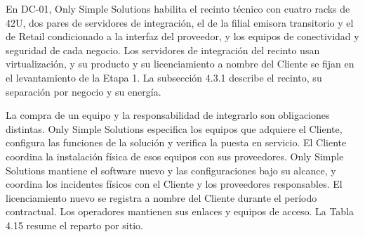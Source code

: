 \documentclass[11pt]{article}
\begin{document}
En DC-01, Only Simple Solutions habilita el recinto técnico con cuatro racks de 42U, dos pares de servidores de integración, el de la filial emisora transitorio y el de Retail condicionado a la interfaz del proveedor, y los equipos de conectividad y seguridad de cada negocio. Los servidores de integración del recinto usan virtualización, y su producto y su licenciamiento a nombre del Cliente se fijan en el levantamiento de la Etapa 1. La subsección 4.3.1 describe el recinto, su separación por negocio y su energía.

La compra de un equipo y la responsabilidad de integrarlo son obligaciones distintas. Only Simple Solutions especifica los equipos que adquiere el Cliente, configura las funciones de la solución y verifica la puesta en servicio. El Cliente coordina la instalación física de esos equipos con sus proveedores. Only Simple Solutions mantiene el software nuevo y las configuraciones bajo su alcance, y coordina los incidentes físicos con el Cliente y los proveedores responsables. El licenciamiento nuevo se registra a nombre del Cliente durante el período contractual. Los operadores mantienen sus enlaces y equipos de acceso. La Tabla 4.15 resume el reparto por sitio.

\par\vspace{0pt plus 10\baselineskip}\vspace{0pt plus -10\baselineskip}
\end{document}
